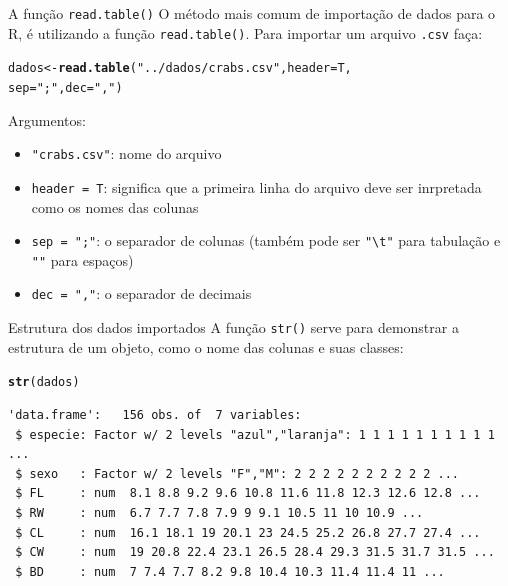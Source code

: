 \documentclass[10pt]{beamer}\usepackage[]{graphicx}\usepackage[]{color}
\makeatletter
\newcommand{\hlstr}[1]{\textcolor[rgb]{0.192,0.494,0.8}{#1}}%
\newcommand{\hlstd}[1]{\textcolor[rgb]{0.345,0.345,0.345}{#1}}%
\newcommand{\hlkwb}[1]{\textcolor[rgb]{0.69,0.353,0.396}{#1}}%
\newcommand{\hlkwc}[1]{\textcolor[rgb]{0.333,0.667,0.333}{#1}}%
\newcommand{\hlkwd}[1]{\textcolor[rgb]{0.737,0.353,0.396}{\textbf{#1}}}%
\newenvironment{kframe}{%
 \def\at@end@of@kframe{}%
 \ifinner\ifhmode%
  \def\at@end@of@kframe{\end{minipage}}%
  \begin{minipage}{\columnwidth}%
 \fi\fi%
 \def\FrameCommand##1{\hskip\@totalleftmargin \hskip-\fboxsep
 \colorbox{shadecolor}{##1}\hskip-\fboxsep
     \hskip-\linewidth \hskip-\@totalleftmargin \hskip\columnwidth}%
 \MakeFramed {\advance\hsize-\width
   \@totalleftmargin\z@ \linewidth\hsize
   \@setminipage}}%
 {\par\unskip\endMakeFramed%
 \at@end@of@kframe}
\newenvironment{knitrout}{}{} %
\makeatother
\begin{document}
\begin{frame}[fragile]{A função \texttt{read.table()}}
O método mais comum de importação de dados para o R, é utilizando a
função \texttt{read.table()}. Para importar um arquivo \texttt{.csv}
faça:
\begin{knitrout}\small
{}\color{fgcolor}\begin{kframe}
\begin{alltt}
\hlstd{dados} \hlkwb{<-} \hlkwd{read.table}\hlstd{(}\hlstr{"../dados/crabs.csv"}\hlstd{,} \hlkwc{header} \hlstd{= T,}
                    \hlkwc{sep} \hlstd{=} \hlstr{";"}\hlstd{,} \hlkwc{dec} \hlstd{=} \hlstr{","}\hlstd{)}
\end{alltt}
\end{kframe}
\end{knitrout}
Argumentos:
\begin{itemize}
\item \verb|"crabs.csv"|: nome do arquivo
\item \texttt{header = T}: significa que a primeira linha do arquivo deve
  ser inrpretada como os nomes das colunas
\item \texttt{sep = ";"}: o separador de colunas (também pode ser
  \verb|"\t"| para tabulação e \verb|""| para espaços)
\item \texttt{dec = ","}: o separador de decimais
\end{itemize}
\end{frame}

\begin{frame}[fragile]{Estrutura dos dados importados}
A função \texttt{str()} serve para demonstrar a estrutura de um objeto,
como o nome das colunas e suas classes:
\begin{knitrout}\small
{}\color{fgcolor}\begin{kframe}
\begin{alltt}
\hlkwd{str}\hlstd{(dados)}
\end{alltt}
\begin{verbatim}
'data.frame':	156 obs. of  7 variables:
 $ especie: Factor w/ 2 levels "azul","laranja": 1 1 1 1 1 1 1 1 1 1 ...
 $ sexo   : Factor w/ 2 levels "F","M": 2 2 2 2 2 2 2 2 2 2 ...
 $ FL     : num  8.1 8.8 9.2 9.6 10.8 11.6 11.8 12.3 12.6 12.8 ...
 $ RW     : num  6.7 7.7 7.8 7.9 9 9.1 10.5 11 10 10.9 ...
 $ CL     : num  16.1 18.1 19 20.1 23 24.5 25.2 26.8 27.7 27.4 ...
 $ CW     : num  19 20.8 22.4 23.1 26.5 28.4 29.3 31.5 31.7 31.5 ...
 $ BD     : num  7 7.4 7.7 8.2 9.8 10.4 10.3 11.4 11.4 11 ...
\end{verbatim}
\end{kframe}
\end{knitrout}
\end{frame}
\end{document}
